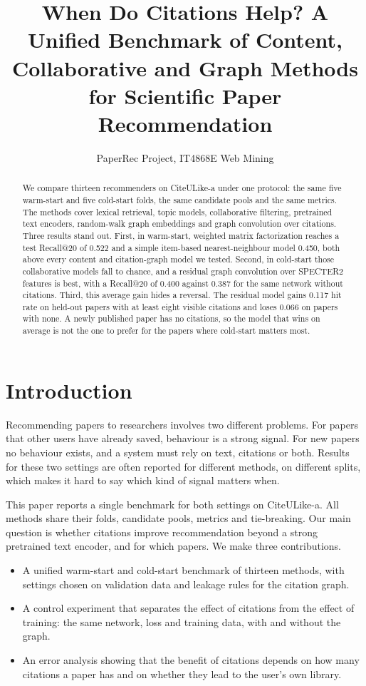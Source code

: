 \documentclass[10pt]{article}
\title{\textbf{When Do Citations Help? A Unified Benchmark of Content, Collaborative and Graph Methods for Scientific Paper Recommendation}}
\author{PaperRec Project, IT4868E Web Mining}
\date{}
\begin{document}
\maketitle

\begin{abstract}
We compare thirteen recommenders on CiteULike-a under one protocol: the same five warm-start and five cold-start folds, the same candidate pools and the same metrics. The methods cover lexical retrieval, topic models, collaborative filtering, pretrained text encoders, random-walk graph embeddings and graph convolution over citations. Three results stand out. First, in warm-start, weighted matrix factorization reaches a test Recall@20 of 0.522 and a simple item-based nearest-neighbour model 0.450, both above every content and citation-graph model we tested. Second, in cold-start those collaborative models fall to chance, and a residual graph convolution over SPECTER2 features is best, with a Recall@20 of 0.400 against 0.387 for the same network without citations. Third, this average gain hides a reversal. The residual model gains 0.117 hit rate on held-out papers with at least eight visible citations and loses 0.066 on papers with none. A newly published paper has no citations, so the model that wins on average is not the one to prefer for the papers where cold-start matters most.
\end{abstract}

\section{Introduction}
Recommending papers to researchers involves two different problems. For papers that other users have already saved, behaviour is a strong signal. For new papers no behaviour exists, and a system must rely on text, citations or both. Results for these two settings are often reported for different methods, on different splits, which makes it hard to say which kind of signal matters when.

This paper reports a single benchmark for both settings on CiteULike-a. All methods share their folds, candidate pools, metrics and tie-breaking. Our main question is whether citations improve recommendation beyond a strong pretrained text encoder, and for which papers. We make three contributions.

\begin{itemize}
\item A unified warm-start and cold-start benchmark of thirteen methods, with settings chosen on validation data and leakage rules for the citation graph.
\item A control experiment that separates the effect of citations from the effect of training: the same network, loss and training data, with and without the graph.
\item An error analysis showing that the benefit of citations depends on how many citations a paper has and on whether they lead to the user's own library.
\end{itemize}
\end{document}
